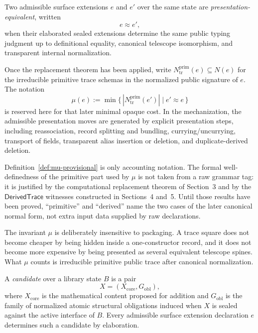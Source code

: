 \documentclass{lmcs}
\begin{document}
\begin{defi}
\label{def:mu-provisional}
Two admissible surface extensions \(e\) and \(e'\) over the same state are
\emph{presentation-equivalent}, written
\[
  e \approx e',
\]
when their elaborated sealed extensions determine the same public typing judgment up to
definitional equality, canonical telescope isomorphism, and transparent internal
normalization.

Once the replacement theorem has been applied, write
\(N_{\mathrm{tr}}^{\mathrm{prim}}(e)\subseteq N(e)\) for the irreducible primitive trace
schemas in the normalized public signature of \(e\).  The notation
\[
  \mu(e) := \min\{\, |N_{\mathrm{tr}}^{\mathrm{prim}}(e')| \mid e' \approx e \,\}
\]
is reserved here for that later minimal opaque cost.
In the mechanization, the admissible presentation moves are generated by explicit
presentation steps, including reassociation, record splitting and bundling,
currying/uncurrying, transport of fields, transparent alias insertion or deletion, and
duplicate-derived deletion.
\end{defi}

Definition~\ref{def:mu-provisional} is only accounting notation.  The formal
well-definedness of the primitive part used by \(\mu\) is not taken from a raw grammar tag:
it is justified by the computational replacement theorem of Section~3 and by the
\(\mathsf{DerivedTrace}\) witnesses constructed in Sections~4 and~5.  Until those results
have been proved, ``primitive'' and ``derived'' name the two cases of the later canonical
normal form, not extra input data supplied by raw declarations.

The invariant \(\mu\) is deliberately insensitive to packaging.  A trace square does not become
cheaper by being hidden inside a one-constructor record, and it does not become more
expensive by being presented as several equivalent telescope spines.  What \(\mu\) counts is
irreducible primitive public trace after canonical normalization.

\begin{defi}[Candidate]
A \emph{candidate} over a library state \(B\) is a pair
\[
  X=(X_{\mathrm{core}},G_{\mathrm{obl}}),
\]
where \(X_{\mathrm{core}}\) is the mathematical content proposed for addition and
\(G_{\mathrm{obl}}\) is the family of normalized atomic structural obligations induced when
\(X\) is sealed against the active interface of \(B\).  Every admissible surface extension
declaration \(e\) determines such a candidate by elaboration.
\end{defi}
\end{document}
